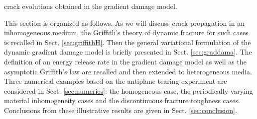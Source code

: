 crack evolutions obtained in the gradient damage model.

This section is organized as follows. As we will discuss crack propagation in an inhomogeneous medium, the Griffith's theory of dynamic fracture for such cases is recalled in Sect. \ref{sec:griffithH}. Then the general variational formulation of the dynamic gradient damage model is briefly presented in Sect. \ref{sec:graddama}. The definition of an energy release rate in the gradient damage model as well as the asymptotic Griffith's law are recalled and then extended to heterogeneous media. Three numerical examples based on the antiplane tearing experiment are considered in Sect. \ref{sec:numerics}: the homogeneous case, the periodically-varying material inhomogeneity cases and the discontinuous fracture toughness cases. Conclusions from these illustrative results are given in Sect. \ref{sec:conclusion}.

